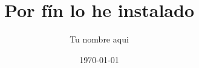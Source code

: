

\title{\bf Por fín lo he instalado}          
\author{Tu nombre aqui}                        
\date{\today}      









\nocite{*}



